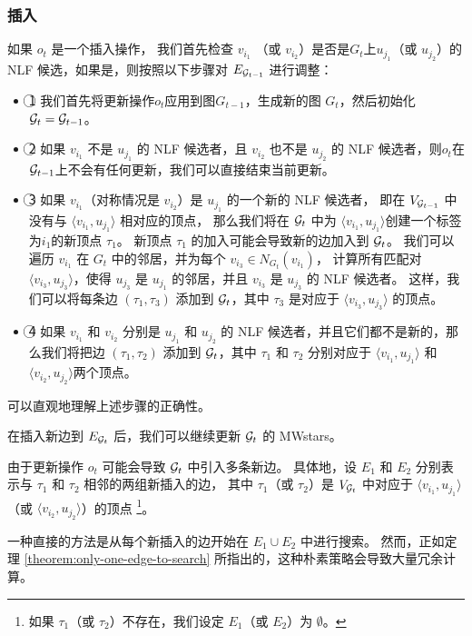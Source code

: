 \subsubsection{插入}
如果 $o_t$ 是一个插入操作，
我们首先检查 $v_{i_1}$ （或 $v_{i_2}$）是否是$G_t$上$u_{j_1}$（或 $u_{j_2}$）的 NLF 候选，如果是，则按照以下步骤对 $E_{\mathcal{G}_{t-1}}$ 进行调整：
\begin{itemize}
\item \textcircled{1} 我们首先将更新操作$o_t$应用到图$G_{t-1}$，生成新的图 $G_t$，然后初始化 $\mathcal{G}_t = \mathcal{G}_{t-1}$。
\item \textcircled{2} 如果 $v_{i_1}$ 不是 $u_{j_1}$ 的 NLF 候选者，且 $v_{i_2}$ 也不是 $u_{j_2}$ 的 NLF 候选者，则$o_t$在$\mathcal{G}_{t-1}$上不会有任何更新，我们可以直接结束当前更新。
\item \textcircled{3} 如果 $v_{i_1}$（对称情况是 $v_{i_2}$）是 $u_{j_1}$ 的一个新的 NLF 候选者，
即在 $V_{\mathcal{G}_{t-1}}$ 中没有与 $\langle v_{i_1}, u_{j_1} \rangle$ 相对应的顶点，
那么我们将在 $\mathcal{G}_t$ 中为 $\langle v_{i_1}, u_{j_1} \rangle$创建一个标签为$i_1$的新顶点 $\tau_1$。
新顶点 $\tau_1$ 的加入可能会导致新的边加入到 $\mathcal{G}_t$。
我们可以遍历 $v_{i_1}$ 在 $G_t$ 中的邻居，并为每个 $v_{i_3}\in N_{G_t}(v_{i_1})$，
计算所有匹配对 $\langle v_{i_3}, u_{j_3} \rangle$，使得 $u_{j_3}$ 是 $u_{j_1}$ 的邻居，并且 $v_{i_3}$ 是 $u_{j_3}$ 的 NLF 候选者。
这样，我们可以将每条边 $(\tau_1, \tau_3)$ 添加到 $\mathcal{G}_t$，其中 $\tau_3$ 是对应于 $\langle v_{i_3}, u_{j_3} \rangle$ 的顶点。
\item \textcircled{4} 如果 $v_{i_1}$ 和 $v_{i_2}$ 分别是 $u_{j_1}$ 和 $u_{j_2}$ 的 NLF 候选者，并且它们都不是新的，那么我们将把边 $(\tau_1, \tau_2)$ 添加到 $\mathcal{G}_t$，其中 $\tau_1$ 和 $\tau_2$ 分别对应于 $\langle v_{i_1}, u_{j_1} \rangle$ 和 $\langle v_{i_2}, u_{j_2} \rangle$两个顶点。
\end{itemize}

可以直观地理解上述步骤的正确性。

在插入新边到 $E_{\mathcal{G}_t}$ 后，我们可以继续更新 $\mathcal{G}_t$ 的 MWstars。

由于更新操作 $o_t$ 可能会导致 $\mathcal{G}_t$ 中引入多条新边。
具体地，设 $E_1$ 和 $E_2$ 分别表示与 $\tau_1$ 和 $\tau_2$ 相邻的两组新插入的边，
其中 $\tau_1$（或 $\tau_2$）是 $V_{\mathcal{G}_t}$ 中对应于 $\langle v_{i_1}, u_{j_1} \rangle$（或 $\langle v_{i_2}, u_{j_2} \rangle$）的顶点
\footnote{如果 $\tau_1$（或 $\tau_2$）不存在，我们设定 $E_1$（或 $E_2$）为 $\emptyset$。}。

一种直接的方法是从每个新插入的边开始在 $E_1 \cup E_2$ 中进行搜索。
然而，正如定理 \ref{theorem:only-one-edge-to-search} 所指出的，这种朴素策略会导致大量冗余计算。

